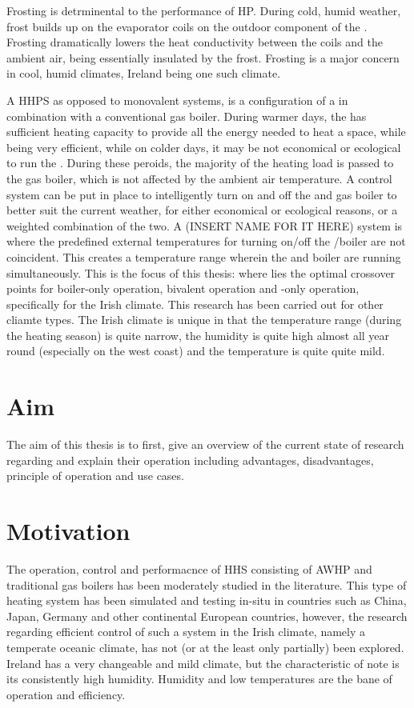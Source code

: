 Frosting is detrminental to the performance of \acs{HP}. During cold, humid weather, frost builds up on the evaporator coils on the outdoor component of the \HP. Frosting dramatically lowers the heat conductivity between the coils and the ambient air, being essentially insulated by the frost. Frosting is a major concern in cool, humid climates, Ireland being one such climate.

A \ac{HHPS} as opposed to monovalent systems, is a configuration of a \HP in combination with a conventional gas boiler. During warmer days, the \HP has sufficient heating capacity to provide all the energy needed to heat a space, while being very efficient, while on colder days, it may be not economical or ecological to run the \HP. During these peroids, the majority of the heating load is passed to the gas boiler, which is not affected by the ambient air temperature. A control system can be put in place to intelligently turn on and off the \HP and gas boiler to better suit the current weather, for either economical or ecological reasons, or a weighted combination of the two. A (INSERT NAME FOR IT HERE) system is where the predefined external temperatures for turning on/off the \HP/boiler are not coincident. This creates a temperature range wherein the \HP and boiler are running simultaneously. This is the focus of this thesis: where lies the optimal crossover points for boiler-only operation, bivalent operation and \HP-only operation, specifically for the Irish climate. This research has been carried out for other cliamte types. The Irish climate is unique in that the temperature range (during the heating season) is quite narrow, the humidity is quite high almost all year round (especially on the west coast) and the temperature is quite quite mild.  

\section{Aim}
The aim of this thesis is to first, give an overview of the current state of research regarding \HPs and explain their operation including advantages, disadvantages, principle of operation and use cases. 

\section{Motivation}
The operation, control and performacnce of \acs{HHS} consisting of \acs{AWHP} and traditional gas boilers has been moderately studied in the literature. This type of heating system has been simulated and testing in-situ in countries such as China, Japan, Germany and other continental European countries, however, the research regarding efficient control of such a system in the Irish climate, namely a temperate oceanic climate, has not (or at the least only partially) been explored. Ireland has a very changeable and mild climate, but the characteristic of note is its consistently high humidity. Humidity and low temperatures are the bane of \HP operation and efficiency.

